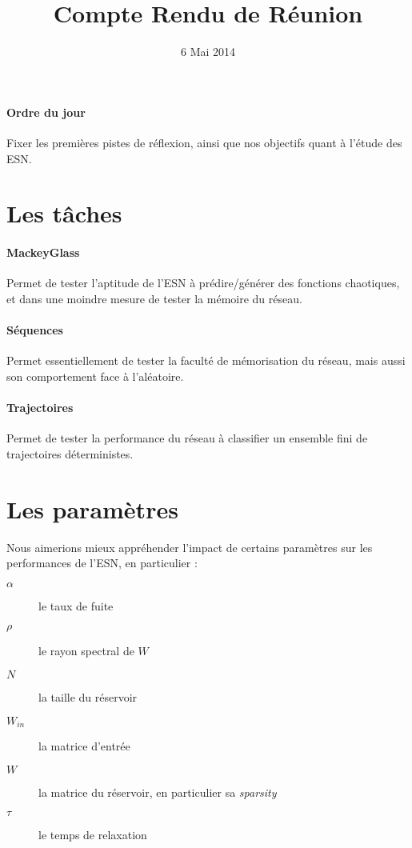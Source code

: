 \documentclass[12pt]{article}
\title{Compte Rendu de Réunion}
\date{6 Mai 2014}
\author{}
\begin{document}
\maketitle

\paragraph{Ordre du jour}
Fixer les premières pistes de réflexion, ainsi que nos objectifs quant à l'étude des ESN.

\section{Les tâches}
\paragraph{MackeyGlass}
Permet de tester l'aptitude de l'ESN à prédire/générer des fonctions chaotiques, et dans une moindre mesure de tester la mémoire du réseau.
\paragraph{Séquences}
Permet essentiellement de tester la faculté de mémorisation du réseau, mais aussi son comportement face à l'aléatoire.
\paragraph{Trajectoires}
Permet de tester la performance du réseau à classifier un ensemble fini de trajectoires déterministes.

\section{Les paramètres}
Nous aimerions mieux appréhender l'impact de certains paramètres sur les performances de l'ESN, en particulier :
\begin{description}
\item[$\alpha$] le taux de fuite
\item[$\rho$] le rayon spectral de $W$
\item[$N$] la taille du réservoir
\item[$W_{in}$] la matrice d'entrée
\item[$W$] la matrice du réservoir, en particulier sa \textit{sparsity}
\item[$\tau$] le temps de relaxation
\end{description}
\end{document}
